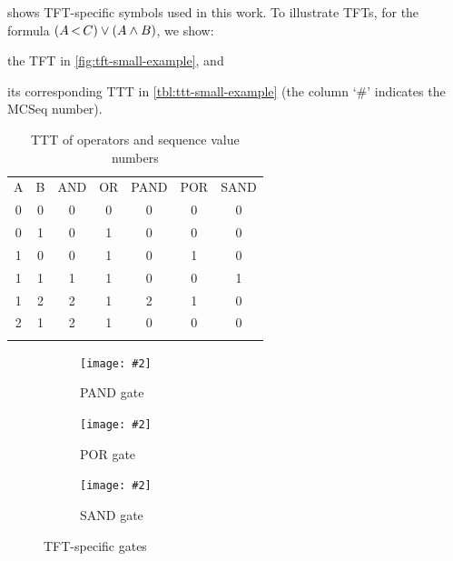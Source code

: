 \documentclass[12pt,openright,twoside,a4paper,oldfontcommands,english,brazil,final]{abntex2}
\theoremstyle{theo}
\newcommand{\includegraphicsaspectratio}[2][1]{%
  \texttt{[image: \#2]}%
}
\newcommand{\parsin}[1]{\ensuremath\left( #1 \right)}
\def\pand{\ensuremath\operatorname{<}}
\begin{document}
%
 shows \ac{TFT}-specific symbols used in this work.
To illustrate \acp{TFT}, for the formula $\parsin{A \pand C} \lor \parsin{A \land B}$, we show:
\begin{alineasinline}
  \item the \ac{TFT} in \cref{fig:tft-small-example}, and
  \item its corresponding \ac{TTT} in \cref{tbl:ttt-small-example} (the column `\#' indicates the \ac{MCSeq} number).
\end{alineasinline}

\begin{table}
\caption{\acs{TTT} of  operators and sequence value numbers}
\label{tbl:tft-operators}
\centering
\begin{tabular}{ccccccc}
\hline\noalign{\smallskip}
A & B & \ac{AND} & \ac{OR} & \ac{PAND} & \ac{POR} & \ac{SAND}  \\
\noalign{\smallskip}\hline\noalign{\smallskip}
0 & 0 & 0 & 0 & 0 & 0 & 0\\
0 & 1 & 0 & 1 & 0 & 0 & 0\\
1 & 0 & 0 & 1 & 0 & 1 & 0\\
1 & 1 & 1 & 1 & 0 & 0 & 1\\
1 & 2 & 2 & 1 & 2 & 1 & 0\\
2 & 1 & 2 & 1 & 0 & 0 & 0\\
\noalign{\smallskip}\hline
\end{tabular}
\end{table}

\begin{figure}[htb]
  \centering
  \begin{subfigure}[b]{0.20\linewidth}
    \centering
    \includegraphicsaspectratio[0.75]{ft-symbol-pand-gate}
    \caption{\acs*{PAND} gate}\label{fig:tft-pand-gate}
  \end{subfigure}
  \begin{subfigure}[b]{0.20\linewidth}
    \centering
    \includegraphicsaspectratio[0.75]{ft-symbol-por-gate}
    \caption{\acs*{POR} gate}\label{fig:tft-por-gate}
  \end{subfigure}
  \begin{subfigure}[b]{0.20\linewidth}
    \centering
    \includegraphicsaspectratio[0.75]{ft-symbol-sand-gate}
    \caption{\acs*{SAND} gate}\label{fig:tft-sand-gate}
  \end{subfigure}
  \caption{\acs*{TFT}-specific gates}
  \label{fig:tft-symbols}
\end{figure}
\end{document}
